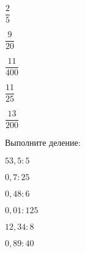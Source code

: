 \begin{class}[number=5]
\begin{listofex}[resume]
\begin{enumcols}[itemcolumns=6]
			\item \( \dfrac{2}{5} \)
			\item \( \dfrac{9}{20} \)
			\item \( \dfrac{11}{400} \)
			\item \( \dfrac{11}{25} \)
			\item \( \dfrac{13}{200} \)
		\end{enumcols}
		\item Выполните деление:
		\begin{enumcols}[itemcolumns=6]
			\item \( 53,5:5 \)
			\item \( 0,7:25 \)
			\item \( 0,48:6 \)
			\item \( 0,01:125 \)
			\item \( 12,34:8 \)
			\item \( 0,89:40 \)
		\end{enumcols}
	\end{listofex}
\end{class}
%
%
